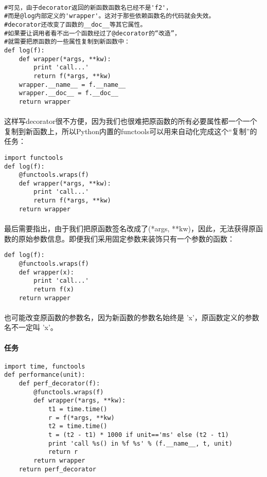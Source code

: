 \documentclass{article}
\begin{document}
\begin{CJK}{UTF8}{gbsn}
\paragraph{}
\begin{verbatim}
#可见，由于decorator返回的新函数函数名已经不是'f2'，
#而是@log内部定义的'wrapper'。这对于那些依赖函数名的代码就会失效。
#decorator还改变了函数的__doc__等其它属性。
#如果要让调用者看不出一个函数经过了@decorator的“改造”，
#就需要把原函数的一些属性复制到新函数中：
def log(f):
    def wrapper(*args, **kw):
        print 'call...'
        return f(*args, **kw)
    wrapper.__name__ = f.__name__
    wrapper.__doc__ = f.__doc__
    return wrapper
\end{verbatim}
\paragraph{}
这样写decorator很不方便，因为我们也很难把原函数的所有必要属性都一个一个复制到新函数上，所以Python内置的functools可以用来自动化完成这个“复制”的任务：
\begin{verbatim}
import functools
def log(f):
    @functools.wraps(f)
    def wrapper(*args, **kw):
        print 'call...'
        return f(*args, **kw)
    return wrapper
\end{verbatim}
\paragraph{}
最后需要指出，由于我们把原函数签名改成了(*args, **kw)，因此，无法获得原函数的原始参数信息。即便我们采用固定参数来装饰只有一个参数的函数：
\begin{verbatim}
def log(f):
    @functools.wraps(f)
    def wrapper(x):
        print 'call...'
        return f(x)
    return wrapper
\end{verbatim}
\paragraph{}
也可能改变原函数的参数名，因为新函数的参数名始终是 'x'，原函数定义的参数名不一定叫 'x'。
\paragraph{任务}
\begin{verbatim}
import time, functools
def performance(unit):
    def perf_decorator(f):
        @functools.wraps(f)
        def wrapper(*args, **kw):
            t1 = time.time()
            r = f(*args, **kw)
            t2 = time.time()
            t = (t2 - t1) * 1000 if unit=='ms' else (t2 - t1)
            print 'call %s() in %f %s' % (f.__name__, t, unit)
            return r
        return wrapper
    return perf_decorator


\end{verbatim}
\end{CJK}
\end{document}
